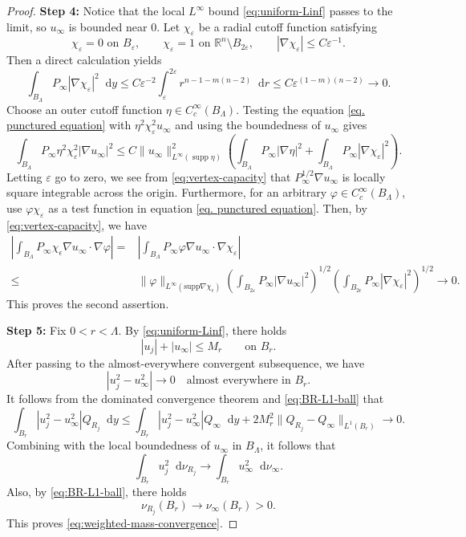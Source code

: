 \documentclass[12pt]{amsart}
\theoremstyle{plain}
\theoremstyle{definition}
\theoremstyle{remark}     %
\numberwithin{equation}{section}
\newcommand{\dd}{\mathop{}\!\mathrm{d}}%
\begin{document}
\begin{proof}
{\bf Step 4:}
Notice that the local $L^\infty$ bound \cref{eq:uniform-Linf} passes to the limit, so $u_\infty$ is bounded
near $0$. 
 Let $\chi_\varepsilon$ be a radial cutoff function satisfying
\[
    \chi_\varepsilon=0\text{ on }B_\varepsilon,
    \qquad
    \chi_\varepsilon=1\text{ on }\mathbb R^n\setminus B_{2\varepsilon},
    \qquad
    |\nabla\chi_\varepsilon|\leq C\varepsilon^{-1}.
\]
Then a direct calculation yields
\begin{equation}\label{eq:vertex-capacity}
    \int_{B_\Lambda} P_\infty|\nabla\chi_\varepsilon|^2\dd y
    \leq
    C\varepsilon^{-2}
    \int_\varepsilon^{2\varepsilon}
    r^{n-1-m(n-2)}\dd r
    \leq C\varepsilon^{(1-m)(n-2)}
    \to 0.
\end{equation}
Choose an outer cutoff function $\eta\in C_c^\infty(B_\Lambda)$.
Testing the equation \cref{eq. punctured equation} with
$\eta^2\chi_\varepsilon^2u_\infty$ and using the boundedness of
$u_\infty$ gives
\[
    \int_{B_\Lambda} P_\infty\eta^2\chi_\varepsilon^2
    |\nabla u_\infty|^2
    \leq
    C\|u_\infty\|_{L^\infty(\operatorname{supp}\eta)}^2
    \left(
    \int_{B_\Lambda} P_\infty|\nabla\eta|^2
    +\int_{B_\Lambda} P_\infty|\nabla\chi_\varepsilon|^2
    \right).
\]
Letting $\varepsilon$ go to zero, we see from \cref{eq:vertex-capacity} that
$P_\infty^{1/2}\nabla u_\infty$ is locally square integrable across the
origin. Furthermore,  for an arbitrary
$\varphi\in C_c^\infty(B_\Lambda)$, use
$\varphi\chi_\varepsilon$ as a test function in  equation \cref{eq. punctured equation}.
Then, by \cref{eq:vertex-capacity}, we have
\begin{align*}
    \left|
    \int_{B_\Lambda}P_{\infty}\chi_\epsilon
    \nabla u_{\infty}\cdot\nabla \varphi
    \right|
    =&\left|
    \int_{B_\Lambda} P_\infty\varphi
    \nabla u_\infty\cdot\nabla\chi_\varepsilon
    \right|\\
    \leq &
\|\varphi\|_{L^\infty (\text{supp}\nabla \chi_\epsilon)}
\left(
\int_{B_{2\varepsilon}}P_\infty|\nabla u_\infty|^2
\right)^{1/2}
\left(
\int_{B_{2\epsilon}} P_\infty|\nabla\chi_\varepsilon|^2
\right)^{1/2}\to0.
\end{align*}
This proves the second assertion.

{\bf Step 5:}
Fix $0<r<\Lambda$.  By \cref{eq:uniform-Linf}, there holds
\[
    |u_j|+|u_\infty|\leq M_r
    \qquad\text{on }B_r.
\]
After passing to the almost-everywhere convergent subsequence, we have
\[
    |u_j^2-u_\infty^2|\to0
    \quad\text{almost everywhere in }B_r.
\]
It follows from the dominated convergence theorem and \cref{eq:BR-L1-ball} that
\begin{equation}
\int_{B_r}|u_j^2-u_\infty^2|Q_{R_j}\dd y
\leq
\int_{B_r}|u_j^2-u_\infty^2|Q_\infty\dd y
+2M_r^2
\|Q_{R_j}-Q_\infty\|_{L^1(B_r)}
\to0.
\label{eq:weighted-square-convergence}
\end{equation}
 Combining with the local boundedness of $u_\infty$ in $B_\Lambda$, it follows that
\[
    \int_{B_r}u_j^2\dd \nu_{R_j}
    \to
    \int_{B_r}u_\infty^2\dd \nu_\infty.
\]
Also, by \cref{eq:BR-L1-ball}, there holds
\[
    \nu_{R_j}(B_r)\to\nu_\infty(B_r)>0.
\]
This proves \cref{eq:weighted-mass-convergence}.


\end{proof}
\end{document}
